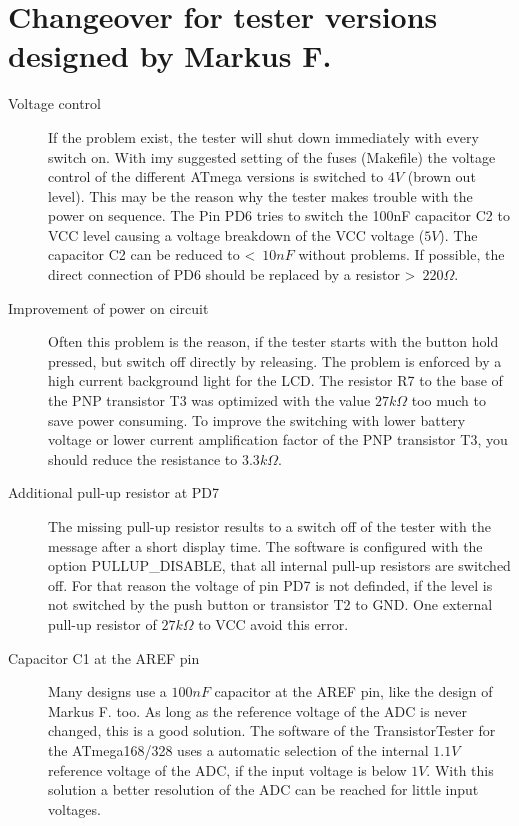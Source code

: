 \section{Changeover for tester versions designed by Markus F.}
\label{sec:change_markus}
\begin{description}

\item[Voltage control]
If the problem exist, the tester will shut down immediately with every switch on.
With imy suggested setting of the fuses (Makefile) the voltage control of the different
ATmega versions is switched to \(4V\) (brown out level).
This may be the reason why the tester makes trouble with the power on sequence.
The Pin PD6 tries to switch the 100nF capacitor C2 to VCC level causing a voltage
breakdown of the VCC voltage (\(5V\)).
The capacitor C2 can be reduced to \textless~\(10nF\) without problems.
If possible, the direct connection of PD6 should be replaced by a resistor \textgreater~\(220\Omega\).
\item[Improvement of power on circuit]
Often this problem is the reason, if the tester starts with the button hold pressed, but switch off
directly by releasing. The problem is enforced by a high current background light for the LCD.
The resistor R7 to the base of the PNP transistor T3 was optimized with the value \(27k\Omega\) 
too much to save power consuming.
To improve the switching with lower battery voltage or lower current amplification factor of
the PNP transistor T3, you should reduce the resistance to \(3.3k\Omega\).
\item[Additional pull-up resistor at PD7]
The missing pull-up resistor results to a switch off of the tester with the message 
after a short display time.
The software is configured with the option PULLUP\_DISABLE, that all internal pull-up
resistors are switched off. For that reason the voltage of pin PD7 is not definded,
if the level is not switched by the push button or transistor T2 to GND.
One external pull-up resistor of \(27k\Omega\) to VCC avoid this error.
\item[Capacitor C1 at the AREF pin]
Many designs use a \(100nF\) capacitor at the AREF pin, like the design of Markus F. too.
As long as the reference voltage of the ADC is never changed, this is a good solution.
The software of the TransistorTester for the ATmega168/328 uses a automatic selection
of the internal \(1.1V\) reference voltage of the ADC, if the input voltage is below \(1V\).
With this solution a better resolution of the ADC can be reached for little input voltages.

\end{description}
